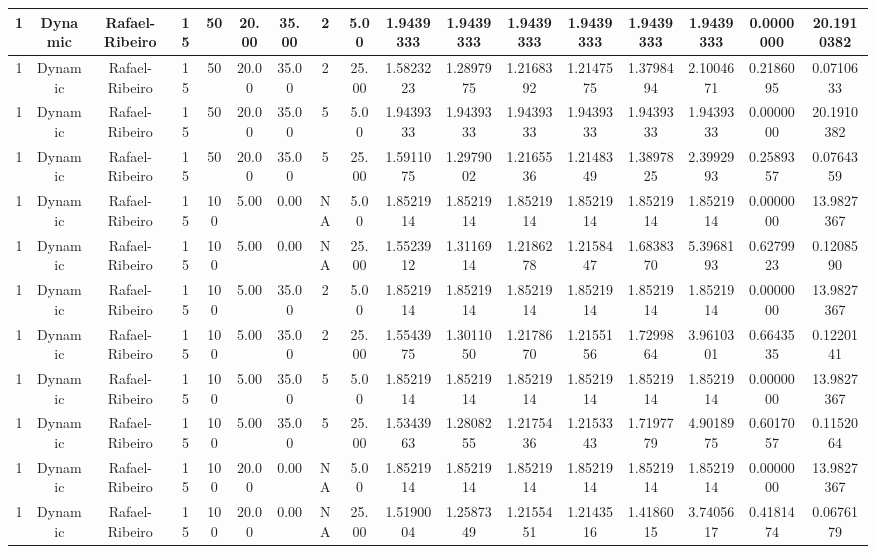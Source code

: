 \documentclass[a4paper]{article}
\begin{document}
\begin{center}
\begin{tabular}{ | c | c | c | c | c | c | c | c | c | c | c | c | c | c | c | c | c | }
		1	&	Dynamic	&	Rafael-Ribeiro	&	15	&	50	&	20.00	&	35.00	&	2	&	5.00	&	1.9439333	&	1.9439333	&	1.9439333	&	1.9439333	&	1.9439333	&	1.9439333	&	0.0000000	&	20.1910382 \\
		\hline
		1	&	Dynamic	&	Rafael-Ribeiro	&	15	&	50	&	20.00	&	35.00	&	2	&	25.00	&	1.5823223	&	1.2897975	&	1.2168392	&	1.2147575	&	1.3798494	&	2.1004671	&	0.2186095	&	0.0710633 \\
		\hline
		1	&	Dynamic	&	Rafael-Ribeiro	&	15	&	50	&	20.00	&	35.00	&	5	&	5.00	&	1.9439333	&	1.9439333	&	1.9439333	&	1.9439333	&	1.9439333	&	1.9439333	&	0.0000000	&	20.1910382 \\
		\hline
		1	&	Dynamic	&	Rafael-Ribeiro	&	15	&	50	&	20.00	&	35.00	&	5	&	25.00	&	1.5911075	&	1.2979002	&	1.2165536	&	1.2148349	&	1.3897825	&	2.3992993	&	0.2589357	&	0.0764359 \\
		\hline
		1	&	Dynamic	&	Rafael-Ribeiro	&	15	&	100	&	5.00	&	0.00	&	NA	&	5.00	&	1.8521914	&	1.8521914	&	1.8521914	&	1.8521914	&	1.8521914	&	1.8521914	&	0.0000000	&	13.9827367 \\
		\hline
		1	&	Dynamic	&	Rafael-Ribeiro	&	15	&	100	&	5.00	&	0.00	&	NA	&	25.00	&	1.5523912	&	1.3116914	&	1.2186278	&	1.2158447	&	1.6838370	&	5.3968193	&	0.6279923	&	0.1208590 \\
		\hline
		1	&	Dynamic	&	Rafael-Ribeiro	&	15	&	100	&	5.00	&	35.00	&	2	&	5.00	&	1.8521914	&	1.8521914	&	1.8521914	&	1.8521914	&	1.8521914	&	1.8521914	&	0.0000000	&	13.9827367 \\
		\hline
		1	&	Dynamic	&	Rafael-Ribeiro	&	15	&	100	&	5.00	&	35.00	&	2	&	25.00	&	1.5543975	&	1.3011050	&	1.2178670	&	1.2155156	&	1.7299864	&	3.9610301	&	0.6643535	&	0.1220141 \\
		\hline
		1	&	Dynamic	&	Rafael-Ribeiro	&	15	&	100	&	5.00	&	35.00	&	5	&	5.00	&	1.8521914	&	1.8521914	&	1.8521914	&	1.8521914	&	1.8521914	&	1.8521914	&	0.0000000	&	13.9827367 \\
		\hline
		1	&	Dynamic	&	Rafael-Ribeiro	&	15	&	100	&	5.00	&	35.00	&	5	&	25.00	&	1.5343963	&	1.2808255	&	1.2175436	&	1.2153343	&	1.7197779	&	4.9018975	&	0.6017057	&	0.1152064 \\
		\hline
		1	&	Dynamic	&	Rafael-Ribeiro	&	15	&	100	&	20.00	&	0.00	&	NA	&	5.00	&	1.8521914	&	1.8521914	&	1.8521914	&	1.8521914	&	1.8521914	&	1.8521914	&	0.0000000	&	13.9827367 \\
		\hline
		1	&	Dynamic	&	Rafael-Ribeiro	&	15	&	100	&	20.00	&	0.00	&	NA	&	25.00	&	1.5190004	&	1.2587349	&	1.2155451	&	1.2143516	&	1.4186015	&	3.7405617	&	0.4181474	&	0.0676179 \\
		\hline

\end{tabular}
\end{center}
\end{document}
